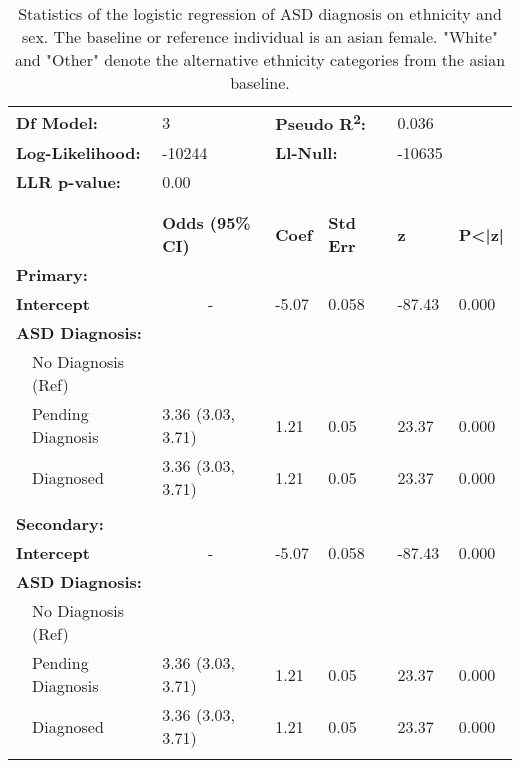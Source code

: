 \documentclass[
]{article}
\begin{document}
\begin{table}[H]
\begin{scriptsize}
\begin{tabular}{lllllll}
\multicolumn{2}{l}{\hspace{1cm}\textbf{Df Model:}} & 3 & \multicolumn{2}{l}{\textbf{Pseudo R\textsuperscript{2}:}} & 0.036 & \\[0.5mm]
\multicolumn{2}{l}{\hspace{1cm}\textbf{Log-Likelihood:}} & -10244 & \multicolumn{2}{l}{\textbf{Ll-Null:}} & -10635 & \\[0.5mm]
\multicolumn{2}{l}{\hspace{1cm}\textbf{LLR p-value:}} & \multicolumn{5}{l}{0.00} \\\\
\midrule\\
& & \textbf{Odds (95\% CI)} & \textbf{Coef} & \textbf{Std Err} & \textbf{z} & \textbf{P\textless|z|} \\[1.5mm]
\multicolumn{2}{l}{\textbf{Primary:}} & & & & & \\[1.5mm]
\multicolumn{2}{l}{\hspace{0.5cm}\textbf{Intercept}} & \multicolumn{1}{c}{-} & -5.07 & 0.058 & -87.43 & 0.000 \\[0.5mm]
\multicolumn{2}{l}{\hspace{0.5cm}\textbf{ASD Diagnosis:}} & & & & & \\
& \hspace{0.5cm}No Diagnosis (Ref) & & & & & \\
& \hspace{0.5cm}Pending Diagnosis & 3.36 (3.03, 3.71) & 1.21 & 0.05 & 23.37 & 0.000 \\
& \hspace{0.5cm}Diagnosed & 3.36 (3.03, 3.71) & 1.21 & 0.05 & 23.37 & 0.000 \\\\
\multicolumn{2}{l}{\textbf{Secondary:}} & & & & & \\[1.5mm]
\multicolumn{2}{l}{\hspace{0.5cm}\textbf{Intercept}} & \multicolumn{1}{c}{-} & -5.07 & 0.058 & -87.43 & 0.000 \\[0.5mm]
\multicolumn{2}{l}{\hspace{0.5cm}\textbf{ASD Diagnosis:}} & & & & & \\
& \hspace{0.5cm}No Diagnosis (Ref) & & & & & \\
& \hspace{0.5cm}Pending Diagnosis & 3.36 (3.03, 3.71) & 1.21 & 0.05 & 23.37 & 0.000 \\
& \hspace{0.5cm}Diagnosed & 3.36 (3.03, 3.71) & 1.21 & 0.05 & 23.37 & 0.000 \\\\
\bottomrule
\end{tabular}
\end{scriptsize}
\caption{Statistics of the logistic regression of ASD diagnosis on ethnicity and sex. The baseline or reference individual is an asian female. "White" and "Other" denote the alternative ethnicity categories from the asian baseline.}
\label{tab:log_reg_results}
\end{table}
\end{document}

